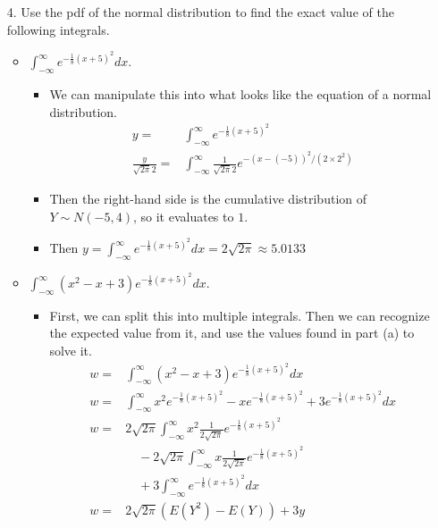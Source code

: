 \documentclass{article}
\begin{document}
\begin{enumerate}
\item [4.] Use the pdf of the normal distribution to find the exact value of the following integrals.
    \begin{itemize}
    \item $\int_{-\infty}^{\infty}e^{-\frac{1}{8}(x+5)^2}dx$.
        \begin{itemize}
        \item We can manipulate this into what looks like the equation of a normal distribution.
        \begin{equation*}
            \begin{aligned}
            y = & \int_{-\infty}^{\infty}e^{-\frac{1}{8}(x+5)^2} \\
            \frac{y}{\sqrt{2 \pi} 2} = & \int_{-\infty}^{\infty} \frac{1}{\sqrt{2 \pi} 2} e^{-(x - (-5))^2 / (2 \times 2^2)}
            \end{aligned}
        \end{equation*}
        \item Then the right-hand side is the cumulative distribution of $Y \sim N(-5, 4)$, so it evaluates to $1$.
        \item Then $y = \int_{-\infty}^{\infty}e^{-\frac{1}{8}(x+5)^2}dx = 2 \sqrt{2 \pi} \approx 5.0133 $
        \end{itemize}
    \item $\int_{-\infty}^{\infty}(x^2-x+3)e^{-\frac{1}{8}(x+5)^2}dx$.
        \begin{itemize}
        \item First, we can split this into multiple integrals. Then we can recognize the expected value from it, and use the values found in part (a) to solve it.
        \begin{equation*}
            \begin{aligned}
            w = & \int_{-\infty}^{\infty}(x^2-x+3)e^{-\frac{1}{8}(x+5)^2}dx \\
            w = & \int_{-\infty}^{\infty}x^2 e^{-\frac{1}{8}(x+5)^2} - x e^{-\frac{1}{8}(x+5)^2} + 3 e^{-\frac{1}{8}(x+5)^2}dx \\
            w = & 2\sqrt{2 \pi} \int_{-\infty}^{\infty}x^2 \frac{1}{2\sqrt{2 \pi}} e^{-\frac{1}{8}(x+5)^2} \\
                & \quad - 2\sqrt{2 \pi} \int_{-\infty}^{\infty} x \frac{1}{2\sqrt{2 \pi}} e^{-\frac{1}{8}(x+5)^2} \\
                & \quad + 3\int_{-\infty}^{\infty} e^{-\frac{1}{8}(x+5)^2}dx \\
            w = & 2\sqrt{2 \pi}(E(Y^2) - E(Y)) + 3y \\

\end{aligned}
\end{equation*}
\end{itemize}
\end{itemize}
\end{enumerate}
\end{document}
